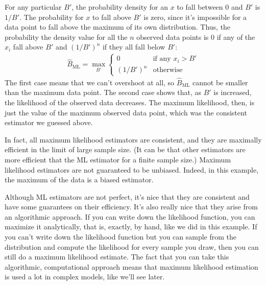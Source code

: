 For any particular $B'$, the probability density for an $x$ to fall between 0
and $B'$ is $1/B'$. The probability for $x$ to fall above $B'$ is zero, since
it's impossible for a data point to fall above the maximum of its own
distribution. Thus, the probability the density value for all the $n$ observed
data points is 0 if any of the $x_i$ fall above $B'$ and $(1/B')^n$ if they all
fall below $B'$:
\begin{align*}
\hat{B}_\text{ML} = \max_{B'} \begin{cases}
0 &\text{if any $x_i > B'$} \\
(1 / B')^n &\text{otherwise}
\end{cases}
\end{align*}
The first case means that we can't overshoot at all, so $\hat{B}_\text{ML}$
cannot be smaller than the maximum data point. The second case shows that,
as $B'$ is increased, the likelihood of the observed data decreases. The maximum
likelihood, then, is just the value of the maximum observed data point, which
was the consistent estimator we guessed above.

In fact, all maximum likelihood estimators are consistent, and they are
maximally efficient in the limit of large sample size. (It can be that other
estimators are more efficient that the ML estimator for a finite sample size.)
Maximum likelihood estimators are not guaranteed to be unbiased. Indeed, in this
example, the maximum of the data is a biased estimator.

Although ML estimators are not perfect, it's nice that they are consistent and
have some guarantees on their efficiency. It's also really nice that they
arise from an algorithmic approach. If you can write down the likelihood
function, you can maximize it analytically, that is, exactly, by hand, like we
did in this example. If you can't write down the likelihood function but you
can sample from the distribution and compute the likelihood for every sample
you draw, then you can still do a maximum likelihood estimate. The fact that
you can take this algorithmic, computational approach means that maximum
likelihood estimation is used a lot in complex models, like we'll see later.

